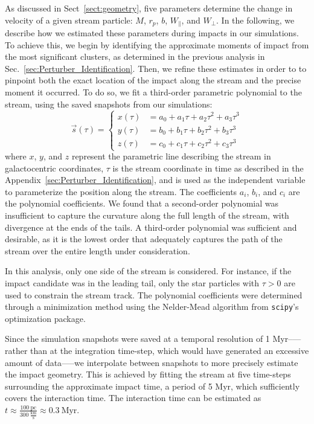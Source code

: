 \documentclass{aa}
\begin{document}
\begin{appendix}
    As discussed in Sect~\ref{sect:geometry},  five parameters determine the change in velocity of a given stream particle: $M$, $r_p$, $b$, $W_\parallel$, and $W_\perp$. In the following, we describe how we estimated these parameters during impacts in our simulations.
    To achieve this, we begin by identifying the approximate moments of impact from the most significant clusters, as determined in the previous analysis in Sec.~\ref{sec:Perturber_Identification}. Then, we refine these estimates in order to to pinpoint both the exact location of the impact along the stream and the precise moment it occurred. To do so, we fit a third-order parametric polynomial to the stream, using the saved snapshots from our simulations:
      \begin{equation}
        \vec{s}(\tau) = 
        \left\{
          \begin{aligned}
            x(\tau) &= a_0 + a_1 \tau + a_2 \tau^2 + a_3 \tau^3 \\ 
            y(\tau) &= b_0 + b_1 \tau + b_2 \tau^2 + b_3 \tau^3 \\
            z(\tau) &= c_0 + c_1 \tau + c_2 \tau^2 + c_3 \tau^3
          \end{aligned}
        \right.
        \end{equation}  
      where $x$, $y$, and $z$ represent the parametric line describing the stream in galactocentric coordinates, $\tau$ is the stream coordinate in time as described in the Appendix~\ref{sec:Perturber_Identification}, and is used as the independent variable to parameterize the position along the stream. The coefficients $a_i$, $b_i$, and $c_i$ are the polynomial coefficients. We found that a second-order polynomial was insufficient to capture the curvature along the full length of the stream, with divergence at the ends of the tails. A third-order polynomial was sufficient and desirable, as it is the lowest order that adequately captures the path of the stream over the entire length under consideration.

      In this analysis, only one side of the stream is considered. For instance, if the impact candidate was in the leading tail, only the star particles with $\tau > 0$ are used to constrain the stream track. The polynomial coefficients were determined through a minimization method using the Nelder-Mead algorithm from \texttt{scipy}'s optimization package.

      Since the simulation snapshots were saved at a temporal resolution of 1 Myr--—rather than at the integration time-step, which would have generated an excessive amount of data—--we interpolate between snapshots to more precisely estimate the impact geometry. This is achieved by fitting the stream at five time-steps surrounding the approximate impact time, a period of 5 Myr, which sufficiently covers the interaction time. The interaction time can be estimated as $t \approx \frac{100~\text{pc}}{300~\frac{\text{km}}{\text{s}}} \approx 0.3~\text{Myr}$.


\end{appendix}
\end{document}

